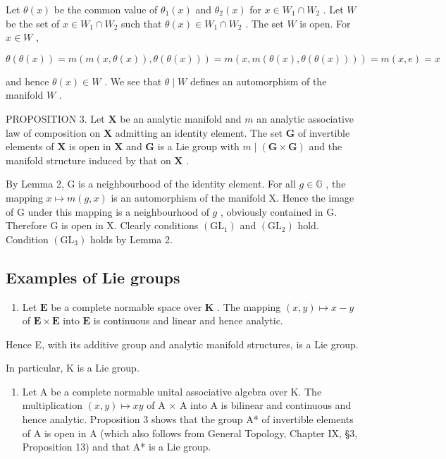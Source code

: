 Let \(\theta(x)\) be the common value of \(\theta_1(x)\) and \(\theta_2(x)\) for \(x \in W_1 \cap W_2\) . Let \(W\) be the set of \(x \in W_1 \cap W_2\) such that \(\theta(x) \in W_1 \cap W_2\) . The set \(W\) is open. For \(x \in W\) ,

\[
\theta (\theta (x)) = m (m (x, \theta (x)), \theta (\theta (x))) = m (x, m (\theta (x), \theta (\theta (x)))) = m (x, e) = x
\]

and hence \(\theta(x) \in W\) . We see that \(\theta \mid W\) defines an automorphism of the manifold \(W\) .

PROPOSITION 3. Let \(\mathbf{X}\) be an analytic manifold and \(m\) an analytic associative law of composition on \(\mathbf{X}\) admitting an identity element. The set \(\mathbf{G}\) of invertible elements of \(\mathbf{X}\) is open in \(\mathbf{X}\) and \(\mathbf{G}\) is a Lie group with \(m \mid (\mathbf{G} \times \mathbf{G})\) and the manifold structure induced by that on \(\mathbf{X}\) .

By Lemma 2, G is a neighbourhood of the identity element. For all \(g \in \mathbb{G}\) , the mapping \(x \mapsto m(g, x)\) is an automorphism of the manifold X. Hence the image of G under this mapping is a neighbourhood of \(g\) , obviously contained in G. Therefore G is open in X. Clearly conditions \((\mathrm{GL}_1)\) and \((\mathrm{GL}_2)\) hold. Condition \((\mathrm{GL}_3)\) holds by Lemma 2.

\subsection*{Examples of Lie groups}

\begin{enumerate}
\def\labelenumi{(\arabic{enumi})}
\tightlist
\item
  Let \(\mathbf{E}\) be a complete normable space over \(\mathbf{K}\) . The mapping \((x, y) \mapsto x - y\) of \(\mathbf{E} \times \mathbf{E}\) into \(\mathbf{E}\) is continuous and linear and hence analytic.
\end{enumerate}

Hence E, with its additive group and analytic manifold structures, is a Lie group.

In particular, K is a Lie group.

\begin{enumerate}
\def\labelenumi{(\arabic{enumi})}
\setcounter{enumi}{1}
\tightlist
\item
  Let A be a complete normable unital associative algebra over K. The multiplication \((x,y)\mapsto xy\) of A × A into A is bilinear and continuous and hence analytic. Proposition 3 shows that the group A* of invertible elements of A is open in A (which also follows from General Topology, Chapter IX, §3, Proposition 13) and that A* is a Lie group.
\end{enumerate}

